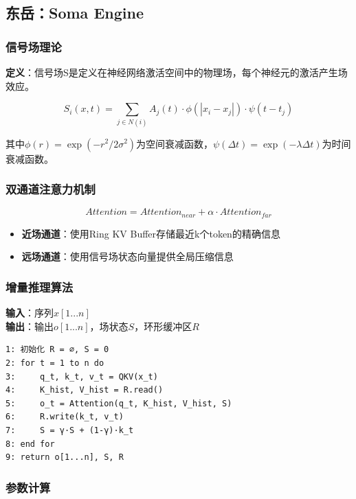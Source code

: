 \documentclass[12pt, a4paper]{article}
\begin{document}
\subsection{东岳：Soma Engine}

\subsubsection{信号场理论}

\textbf{定义}：信号场S是定义在神经网络激活空间中的物理场，每个神经元的激活产生场效应。

\begin{equation}
S_i(x, t) = \sum_{j \in N(i)} A_j(t) \cdot \phi(|x_i - x_j|) \cdot \psi(t - t_j)
\end{equation}

其中$\phi(r) = \exp(-r^2/2\sigma^2)$为空间衰减函数，$\psi(\Delta t) = \exp(-\lambda\Delta t)$为时间衰减函数。

\subsubsection{双通道注意力机制}

\begin{equation}
Attention = Attention_{near} + \alpha \cdot Attention_{far}
\end{equation}

\begin{itemize}
    \item \textbf{近场通道}：使用Ring KV Buffer存储最近k个token的精确信息
    \item \textbf{远场通道}：使用信号场状态向量提供全局压缩信息
\end{itemize}

\subsubsection{增量推理算法}

\textbf{输入}：序列$x[1...n]$\\
\textbf{输出}：输出$o[1...n]$，场状态$S$，环形缓冲区$R$

\begin{verbatim}
1: 初始化 R = ∅, S = 0
2: for t = 1 to n do
3:     q_t, k_t, v_t = QKV(x_t)
4:     K_hist, V_hist = R.read()
5:     o_t = Attention(q_t, K_hist, V_hist, S)
6:     R.write(k_t, v_t)
7:     S = γ·S + (1-γ)·k_t
8: end for
9: return o[1...n], S, R
\end{verbatim}

\subsubsection{参数计算}
\end{document}

